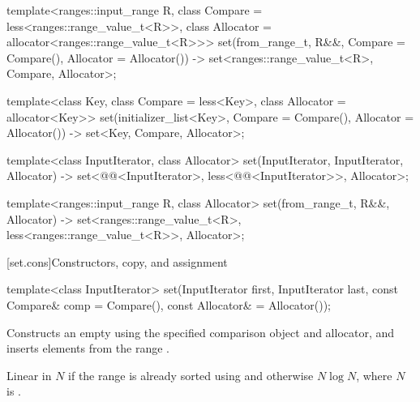 \documentclass{wg21}
\begin{document}
\begin{addedblock}
\begin{codeblock}
    template<ranges::input_range R, class Compare = less<ranges::range_value_t<R>>,
        class Allocator = allocator<ranges::range_value_t<R>>>
    set(from_range_t, R&&, Compare = Compare(), Allocator = Allocator())
    -> set<ranges::range_value_t<R>,  Compare, Allocator>;
\end{codeblock}
\end{addedblock}
\begin{codeblock}

    template<class Key, class Compare = less<Key>, class Allocator = allocator<Key>>
    set(initializer_list<Key>, Compare = Compare(), Allocator = Allocator())
    -> set<Key, Compare, Allocator>;

    template<class InputIterator, class Allocator>
    set(InputIterator, InputIterator, Allocator)
    -> set<@@<InputIterator>,
    less<@@<InputIterator>>, Allocator>;

\end{codeblock}
\begin{addedblock}
\begin{codeblock}
    template<ranges::input_range R,  class Allocator>
    set(from_range_t, R&&, Allocator)
    -> set<ranges::range_value_t<R>,  less<ranges::range_value_t<R>>, Allocator>;
\end{codeblock}
\end{addedblock}
\begin{codeblock}

    template<class Key, class Allocator>
    set(initializer_list<Key>, Allocator) -> set<Key, less<Key>, Allocator>;
}
\end{codeblock}%
%

[set.cons]{Constructors, copy, and assignment}

%
\begin{itemdecl}
    template<class InputIterator>
    set(InputIterator first, InputIterator last,
    const Compare& comp = Compare(), const Allocator& = Allocator());
\end{itemdecl}

\begin{itemdescr}
    \pnum
    \effects
    Constructs an empty
    using the specified comparison object and allocator,
    and inserts elements from the range
    .

    \pnum
    \complexity
    Linear in $N$ if the range
    is already sorted using 
    and otherwise $N \log N$,
    where $N$ is
    .
\end{itemdescr}
\end{document}
